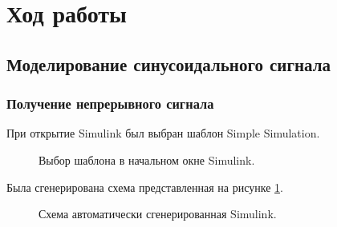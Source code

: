 \documentclass[a4paper,14pt]{extarticle}
\begin{document}
\section{Ход работы}

\subsection{Моделирование синусоидального сигнала}

\subsubsection{Получение непрерывного сигнала}

При открытие Simulink был выбран шаблон Simple Simulation.

\begin{figure}[H]
\caption{Выбор шаблона в начальном окне Simulink.}
\end{figure}

\newpage

Была сгенерирована схема представленная на рисунке \ref{001}.

\begin{figure}[H]
\caption{Схема автоматически сгенерированная Simulink.}
\label{001}
\end{figure}
\end{document}
